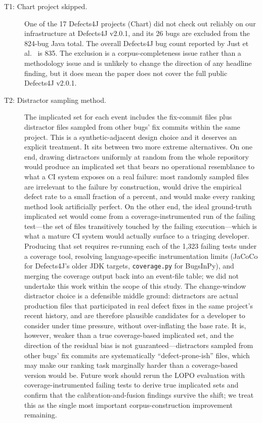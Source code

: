 \documentclass[preprint,12pt]{elsarticle}
\begin{document}
\begin{description}
\item[T1: Chart project skipped.] One of the 17 Defects4J projects (Chart) did not check out reliably on our infrastructure at Defects4J v2.0.1, and its 26 bugs are excluded from the 824-bug Java total. The overall Defects4J bug count reported by Just et al.~\cite{just2014defects4j} is 835. The exclusion is a corpus-completeness issue rather than a methodology issue and is unlikely to change the direction of any headline finding, but it does mean the paper does not cover the full public Defects4J v2.0.1.

\item[T2: Distractor sampling method.] The implicated set for each event includes the fix-commit files plus distractor files sampled from other bugs' fix commits within the same project. This is a synthetic-adjacent design choice and it deserves an explicit treatment. It sits between two more extreme alternatives. On one end, drawing distractors uniformly at random from the whole repository would produce an implicated set that bears no operational resemblance to what a CI system exposes on a real failure: most randomly sampled files are irrelevant to the failure by construction, would drive the empirical defect rate to a small fraction of a percent, and would make every ranking method look artificially perfect. On the other end, the ideal ground-truth implicated set would come from a coverage-instrumented run of the failing test---the set of files transitively touched by the failing execution---which is what a mature CI system would actually surface to a triaging developer. Producing that set requires re-running each of the 1{,}323 failing tests under a coverage tool, resolving language-specific instrumentation limits (JaCoCo for Defects4J's older JDK targets, \texttt{coverage.py} for BugsInPy), and merging the coverage output back into an event-file table; we did not undertake this work within the scope of this study. The change-window distractor choice is a defensible middle ground: distractors are actual production files that participated in real defect fixes in the same project's recent history, and are therefore plausible candidates for a developer to consider under time pressure, without over-inflating the base rate. It is, however, weaker than a true coverage-based implicated set, and the direction of the residual bias is not guaranteed---distractors sampled from other bugs' fix commits are systematically ``defect-prone-ish'' files, which may make our ranking task marginally harder than a coverage-based version would be. Future work should rerun the LOPO evaluation with coverage-instrumented failing tests to derive true implicated sets and confirm that the calibration-and-fusion findings survive the shift; we treat this as the single most important corpus-construction improvement remaining.


\end{description}
\end{document}
